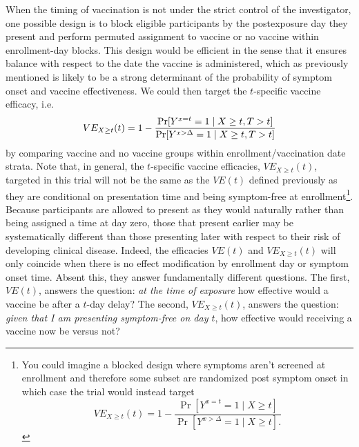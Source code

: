 \documentclass[11pt]{article}
\begin{document}
When the timing of vaccination is not under the strict control of the investigator, one possible design is to block eligible participants by the postexposure day they present and perform permuted assignment to vaccine or no vaccine within enrollment-day blocks. This design would be efficient in the sense that it ensures balance with respect to the date the vaccine is administered, which as previously mentioned is likely to be a strong determinant of the probability of symptom onset and vaccine effectiveness. We could then target the $t$-specific vaccine efficacy, i.e.
$$
VE_{X \geq t}(t) = 1 - \frac{\Pr[Y^{x = t} = 1 \mid X \geq t, T > t]}{\Pr[Y^{x > \Delta} = 1 \mid X \geq t, T > t]} \\
$$
by comparing vaccine and no vaccine groups within enrollment/vaccination date strata. Note that, in general, the $t$-specific vaccine efficacies, $VE_{X \geq t}(t)$, targeted in this trial will not be the same as the $VE(t)$ defined previously as they are conditional on presentation time and being symptom-free at enrollment\footnote{You could imagine a blocked design where symptoms aren't screened at enrollment and therefore some subset are randomized post symptom onset in which case the trial would instead target $$VE_{X \geq t}(t) = 1 - \frac{\Pr[Y^{x = t} = 1 \mid X \geq t]}{\Pr[Y^{x > \Delta} = 1 \mid X \geq t].}$$}. Because participants are allowed to present as they would naturally rather than being assigned a time at day zero, those that present earlier may be systematically different than those presenting later with respect to their risk of developing clinical disease. Indeed, the efficacies $VE(t)$ and $VE_{X \geq t}(t)$ will only coincide when there is no effect modification by enrollment day or symptom onset time. Absent this, they answer fundamentally different questions. The first, $VE(t)$, answers the question: \textit{at the time of exposure} how effective would a vaccine be after a $t$-day delay? The second, $VE_{X \geq t}(t)$, answers the question: \textit{given that I am presenting symptom-free on day $t$}, how effective would receiving a vaccine now be versus not? 


\end{document}
